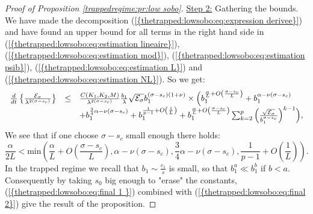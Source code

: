 \documentclass[11pt,a4paper,reqno]{amsart}
\theoremstyle{remark}
\numberwithin{equation}{section}
\begin{document}
\begin{proof}[Proof of Proposition \ref{trappedregime:pr:low sobo}]
\underline{Step 2:} Gathering the bounds. We have made the decomposition {{\rm (\ref{{thetrapped:lowsobo:eq:expression derivee}})}} and have found an upper bound for all terms in the right hand side in {{\rm (\ref{{thetrapped:lowsobo:eq:estimation lineaire}})}}, {{\rm (\ref{{thetrapped:lowsobo:eq:estimation mod}})}}, {{\rm (\ref{{thetrapped:lowsobo:eq:estimation psib}})}}, {{\rm (\ref{{thetrapped:lowsobo:eq:estimation L}})}} and {{\rm (\ref{{thetrapped:lowsobo:eq:estimation NL}})}}. So we get:
\begin{equation} \label{thetrapped:lowsobo:eq:final 1 }
\begin{array}{r c l}
\frac{d}{dt}\left\{ \frac{\mathcal{E}_{\sigma}}{\lambda^{2(\sigma-s_c)}} \right\} &\leq& \frac{C(K_1,K_2,M)}{\lambda^{2(\sigma-s_c)}}\frac{b_1}{\lambda}\sqrt{\mathcal{E}_{\sigma}} b_1^{(\sigma-s_c)(1+\nu)} \times \Bigl( b_1^{\frac{\alpha}{L}+O\left(\frac{\sigma-s_c}{L} \right)} +b_1^{\alpha-\nu(\sigma-s_c)}\\
&&+b_1^{\frac{3}{4}\alpha-\nu(\sigma-s_c)}+b_1^{\frac{1}{p-1}+O\left(\frac{1}{L} \right)}  +b_1^{\frac{\alpha}{L}+O\left(\frac{\sigma-s_c}{L} \right)} \sum_{k=2}^p \left( \frac{\sqrt{\mathcal{E}_{\sigma}}}{b_1^{\sigma-s_c}}\right)^{k-1} \Bigr),
\end{array}
\end{equation}
We see that if one choose $\sigma-s_c$ small enough there holds:
\begin{equation} \label{thetrapped:lowsobo:eq:final 2}
\frac{\alpha}{2L} < \text{min}\left(\frac{\alpha}{L}+O\left(\frac{\sigma-s_c}{L} \right),\alpha-\nu(\sigma-s_c),\frac{3}{4}\alpha-\nu(\sigma-s_c),\frac{1}{p-1}+O\left(\frac{1}{L} \right)\right).
\end{equation}
In the trapped regime we recall that $b_1\sim \frac{c_1}{s}$ is small, so that $b_1^a\ll b_1^b$ if $b< a$. Consequently by taking $s_0$ big enough to "erase" the constants, {{\rm (\ref{{thetrapped:lowsobo:eq:final 1 }})}} combined with {{\rm (\ref{{thetrapped:lowsobo:eq:final 2}})}} give the result of the proposition.
\end{proof}
\end{document}
